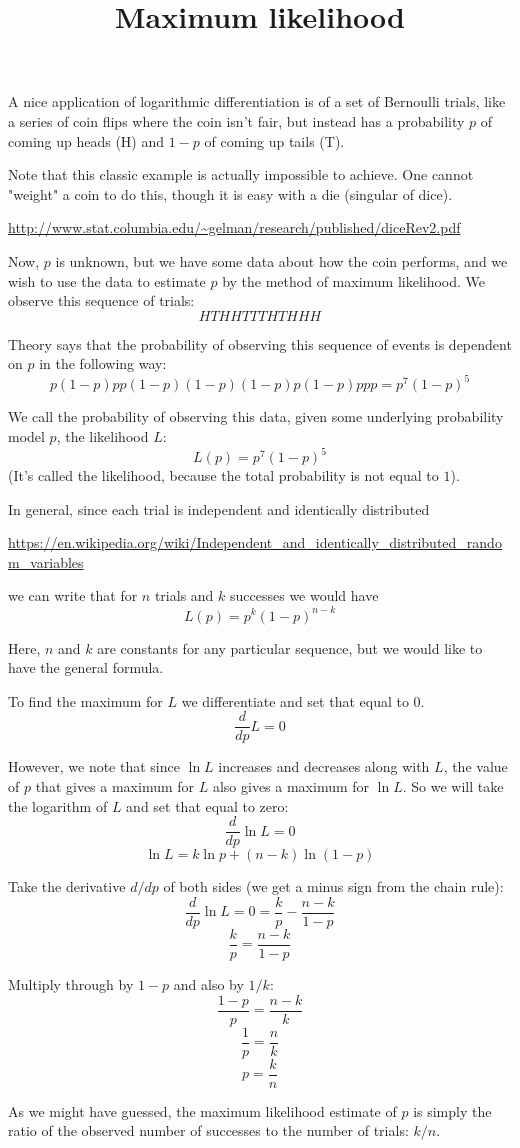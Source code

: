 \documentclass[11pt, oneside]{article}
\title{Maximum likelihood}
\date{}
\begin{document}
\maketitle
\Large

    
A nice application of logarithmic differentiation is of a set of Bernoulli trials, like a series of coin flips where the coin isn't fair, but instead has a probability $p$ of coming up heads (H) and $1-p$ of coming up tails (T).

Note that this classic example is actually impossible to achieve.  One cannot "weight" a coin to do this, though it is easy with a die (singular of dice).

\url{http://www.stat.columbia.edu/~gelman/research/published/diceRev2.pdf}

Now, $p$ is unknown, but we have some data about how the coin performs, and we wish to use the data to estimate $p$ by the method of maximum likelihood.  We observe this sequence of trials:
\[  HTHHTTTHTHHH  \]

Theory says that the probability of observing this sequence of events is dependent on $p$ in the following way:
\[  p(1-p)pp(1-p)(1-p)(1-p)p(1-p)ppp = p^7(1-p)^5  \]

We call the probability of observing this data, given some underlying probability model $p$, the likelihood $L$:
\[  L(p) = p^7(1-p)^5  \]
(It's called the likelihood, because the total probability is not equal to $1$).

In general, since each trial is independent and identically distributed

\url{https://en.wikipedia.org/wiki/Independent_and_identically_distributed_random_variables}

we can write that for $n$ trials and $k$ successes we would have
\[  L(p) = p^k(1-p)^{n-k}  \]

Here, $n$ and $k$ are constants for any particular sequence, but we would like to have the general formula.
 
To find the maximum for $L$ we differentiate and set that equal to 0.
\[  \frac{d}{dp} L = 0  \]

However, we note that since $\ln L$ increases and decreases along with $L$, the value of $p$ that gives a maximum for $L$ also gives a maximum for $\ln L$.  So we will take the logarithm of $L$ and set that equal to zero:
\[  \frac{d}{dp} \ln L = 0  \]
\[  \ln L = k \ln p + (n-k) \ln(1-p)  \]

Take the derivative $d/dp$ of both sides (we get a minus sign from the chain rule):
\[  \frac{d}{dp} \ln L = 0 = \frac{k}{p} - \frac{n-k}{1-p}  \]
\[   \frac{k}{p} = \frac{n-k}{1-p}  \]

Multiply through by $1-p$ and also by $1/k$:
\[  \frac{1-p}{p} = \frac{n-k}{k}  \]
\[   \frac{1}{p} = \frac{n}{k}  \]
\[    p = \frac{k}{n}  \]

As we might have guessed, the maximum likelihood estimate of $p$ is simply the ratio of the observed number of successes to the number of trials:  $k/n$.
\end{document}
